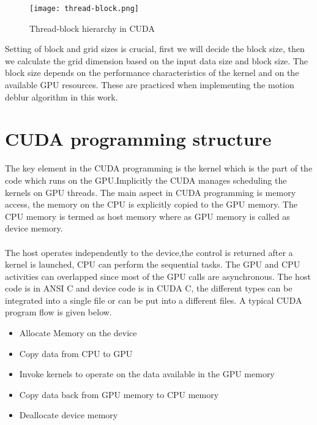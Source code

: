 \begin{figure}[h!]
  \centering
  \texttt{[image: thread-block.png]}
  \caption{Thread-block hierarchy in CUDA}
  \label{Thread-block hierarchy}
\end{figure}
Setting of block and grid sizes is crucial, first we will decide the block size, then we calculate the grid dimension based on the input data size and block size. The block size depends on the performance characteristics of the kernel and on the available GPU resources. These are practiced when implementing the motion deblur algorithm in this work.
\section{CUDA programming structure}
The key element in the CUDA programming is the kernel which is the part of the code which runs on the GPU.Implicitly the CUDA manages scheduling the kernels on GPU threads. The main aspect in CUDA programming is memory access, the memory on the CPU is explicitly copied to the GPU memory. The CPU memory is termed as host memory where as GPU memory is called as device memory.\paragraph*{}The host operates independently to the device,the control is returned after a kernel is launched, CPU can perform the sequential tasks. The GPU and CPU activities can overlapped since most of the GPU calls are asynchronous. The host code is in ANSI C and device code is in CUDA C, the different types can be integrated into a single file or can be put into a different files. A typical CUDA program flow is given below.
\begin{itemize}
\item Allocate Memory on the device
\item Copy data from CPU to GPU
\item Invoke kernels to operate on the data available in the GPU memory
\item Copy data back from GPU memory to CPU memory
\item Deallocate device memory
\end{itemize}
